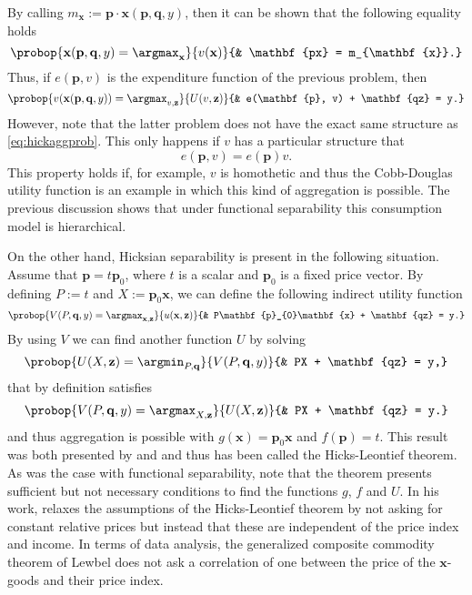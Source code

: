 \documentclass[english, a4paper,12pt]{article}
\begin{document}
By calling $m_{\mathbf{x}} := \mathbf{p}\cdot \mathbf{x}(\mathbf{p}, \mathbf{q}, y)$, then it can be shown that the following equality holds
	$$\probop{\mathbf{x}(\mathbf{p}, \mathbf{q}, y) = \argmax_{\mathbf{x}}}{v(\mathbf{x})}
					{&	\mathbf{px} = m_{\mathbf{x}}.}$$
Thus, if $e(\mathbf{p}, v)$ is the expenditure function of the previous problem, then
	$$	\probop{v(\mathbf{x}(\mathbf{p}, \mathbf{q}, y)) = \argmax_{v, \mathbf{z}}}{U(v, \mathbf{z})}
				{&	e(\mathbf{p}, v) + \mathbf{qz} = y.}
	$$
However, note that the latter problem does not have the exact same structure as \eqref{eq:hickaggprob}. This only happens if $v$ has a particular structure that 
	$$e(\mathbf{p}, v) = e(\mathbf{p})v.$$
This property holds if, for example, $v$ is homothetic and thus the Cobb-Douglas utility function is an example in which this kind of aggregation is possible. The previous discussion shows that under functional separability this consumption model is hierarchical.

On the other hand, Hicksian separability is present in the following situation. Assume that $\mathbf{p} = t\mathbf{p}_{0}$, where $t$ is a scalar and $\mathbf{p}_{0}$ is a fixed price vector. By defining $P := t$ and $X := \mathbf{p}_{0}\mathbf{x}$, we can define the following indirect utility function
	$$	\probop{V(P, \mathbf{q}, y) = \argmax_{\mathbf{x}, \mathbf{z}}}{u(\mathbf{x}, \mathbf{z})}
				{&	P\mathbf{p}_{0}\mathbf{x} + \mathbf{qz} = y.}
	$$
By using $V$ we can find another function $U$ by solving
	$$	\probop{U(X, \mathbf{z}) = \argmin_{P, \mathbf{q}}}{V(P, \mathbf{q},y)}
				{&	PX + \mathbf{qz} = y,}
	$$
that by definition satisfies
	$$	\probop{V(P, \mathbf{q}, y) = \argmax_{X, \mathbf{z}}}{U(X, \mathbf{z})}
				{&	PX + \mathbf{qz} = y.}
	$$
and thus aggregation is possible with $g(\mathbf{x}) = \mathbf{p}_{0}\mathbf{x}$ and $f(\mathbf{p}) = t$. This result was both presented by \cite{Leontief36} and \cite{HicksBook} and thus has been called the Hicks-Leontief theorem. As was the case with functional separability, note that the theorem presents sufficient but not necessary conditions to find the functions $g$, $f$ and $U$. In his work, \cite{Lewbel96} relaxes the assumptions of the Hicks-Leontief theorem by not asking for constant relative prices but instead that these are independent of the price index and income. In terms of data analysis, the generalized composite commodity theorem of Lewbel does not ask a correlation of one between the price of the $\mathbf{x}$-goods and their price index.
\end{document}
